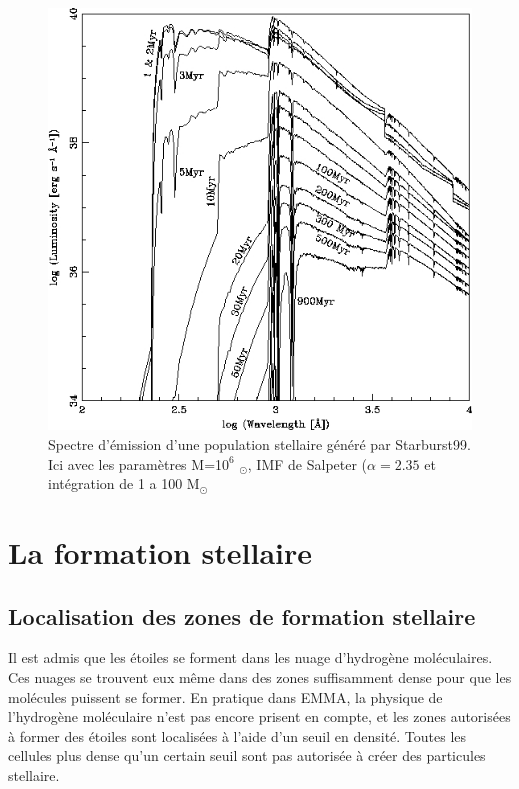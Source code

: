 \begin{figure}[htbp]
        \includegraphics[width=.95\linewidth]{img/03/spectre_starburst.jpg} 
        \caption{Spectre d'émission d'une population stellaire généré par Starburst99.
        Ici avec les paramètres M=1$0^6$ $_\odot$, \ac{IMF} de Salpeter ($\alpha=2.35$ et intégration de 1 a 100 M$_\odot$ 
 		\label{fig:spectre_starburst}}
\end{figure}

\section{La formation stellaire}

\subsection{Localisation des zones de formation stellaire}

Il est admis que les étoiles se forment dans les nuage d'hydrogène moléculaires. %
Ces nuages se trouvent eux même dans des zones suffisamment dense pour que les molécules puissent se former.
En pratique dans EMMA, la physique de l'hydrogène moléculaire n'est pas encore prisent en compte, et les zones autorisées à former des étoiles sont localisées à l'aide d'un seuil en densité.
Toutes les cellules plus dense qu'un certain seuil sont pas autorisée à créer des particules stellaire.

